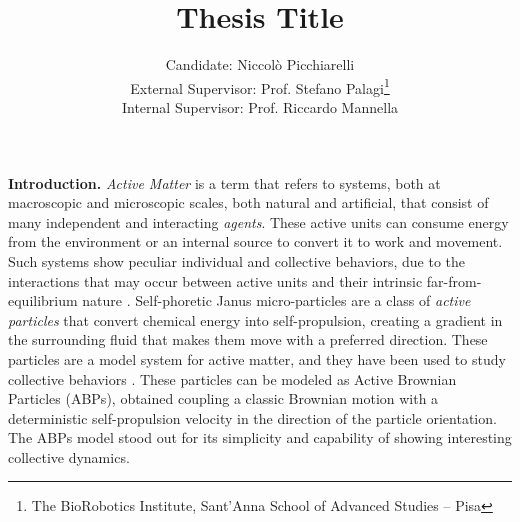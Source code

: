 \documentclass[a4paper, notitlepage]{report} %
\title{Thesis Title}
\author{Candidate: Niccolò Picchiarelli \\
External Supervisor: Prof. Stefano Palagi\footnote{The BioRobotics Institute, Sant'Anna School of Advanced Studies -- Pisa}\\
Internal Supervisor: Prof. Riccardo Mannella}
\begin{document}
	\vspace{-4cm}
	\maketitle
	\textbf{Introduction.}
	\emph{Active Matter} is a term that refers to systems, both at macroscopic and microscopic scales, both natural and artificial, that consist of many independent and interacting \emph{agents}. 
	These active units can consume energy from the environment or an internal source to convert it to work and movement. 
	Such systems show peculiar individual and collective behaviors, due to the interactions that may occur between active units and their intrinsic far-from-equilibrium nature \cite{menon_active_2010, ramaswamy_active_2017}.
	Self-phoretic Janus micro-particles are a class of \emph{active particles} that convert chemical energy into self-propulsion, creating a gradient in the surrounding fluid that makes them move with a preferred direction.
	These particles are a model system for active matter, and they have been used to study collective behaviors \cite{bechinger_active_2016}.
	These particles can be modeled as Active Brownian Particles (ABPs), obtained coupling a classic Brownian motion with a deterministic self-propulsion velocity in the direction of the particle orientation.
	The ABPs model stood out for its simplicity and capability of showing interesting collective dynamics.
	
	
\end{document}

